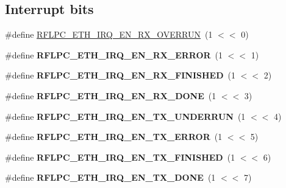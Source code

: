 \subsection*{Interrupt bits}
\begin{DoxyCompactItemize}
\item 
\#define \hyperlink{group__eth_ga0470a2297e3d90c742bea3417541d737}{R\-F\-L\-P\-C\-\_\-\-E\-T\-H\-\_\-\-I\-R\-Q\-\_\-\-E\-N\-\_\-\-R\-X\-\_\-\-O\-V\-E\-R\-R\-U\-N}~(1 $<$$<$ 0)
\item 
\hypertarget{group__eth_ga6329f5555827f898aaf654485a9f3be3}{\#define {\bfseries R\-F\-L\-P\-C\-\_\-\-E\-T\-H\-\_\-\-I\-R\-Q\-\_\-\-E\-N\-\_\-\-R\-X\-\_\-\-E\-R\-R\-O\-R}~(1 $<$$<$ 1)}\label{group__eth_ga6329f5555827f898aaf654485a9f3be3}

\item 
\hypertarget{group__eth_ga85bc0906a286f028975162407b00564f}{\#define {\bfseries R\-F\-L\-P\-C\-\_\-\-E\-T\-H\-\_\-\-I\-R\-Q\-\_\-\-E\-N\-\_\-\-R\-X\-\_\-\-F\-I\-N\-I\-S\-H\-E\-D}~(1 $<$$<$ 2)}\label{group__eth_ga85bc0906a286f028975162407b00564f}

\item 
\hypertarget{group__eth_gaba98ac40cdc532abcef7c120eca14d91}{\#define {\bfseries R\-F\-L\-P\-C\-\_\-\-E\-T\-H\-\_\-\-I\-R\-Q\-\_\-\-E\-N\-\_\-\-R\-X\-\_\-\-D\-O\-N\-E}~(1 $<$$<$ 3)}\label{group__eth_gaba98ac40cdc532abcef7c120eca14d91}

\item 
\hypertarget{group__eth_gab4d04836a465bcfaf614de6e069237dd}{\#define {\bfseries R\-F\-L\-P\-C\-\_\-\-E\-T\-H\-\_\-\-I\-R\-Q\-\_\-\-E\-N\-\_\-\-T\-X\-\_\-\-U\-N\-D\-E\-R\-R\-U\-N}~(1 $<$$<$ 4)}\label{group__eth_gab4d04836a465bcfaf614de6e069237dd}

\item 
\hypertarget{group__eth_ga2d05e34a39b0d75ad049e5d1fac395d6}{\#define {\bfseries R\-F\-L\-P\-C\-\_\-\-E\-T\-H\-\_\-\-I\-R\-Q\-\_\-\-E\-N\-\_\-\-T\-X\-\_\-\-E\-R\-R\-O\-R}~(1 $<$$<$ 5)}\label{group__eth_ga2d05e34a39b0d75ad049e5d1fac395d6}

\item 
\hypertarget{group__eth_ga8085ea43564e1ca5bf301bdbb063ff48}{\#define {\bfseries R\-F\-L\-P\-C\-\_\-\-E\-T\-H\-\_\-\-I\-R\-Q\-\_\-\-E\-N\-\_\-\-T\-X\-\_\-\-F\-I\-N\-I\-S\-H\-E\-D}~(1 $<$$<$ 6)}\label{group__eth_ga8085ea43564e1ca5bf301bdbb063ff48}

\item 
\hypertarget{group__eth_gad98d37754b45f06261b90341e5bf93a8}{\#define {\bfseries R\-F\-L\-P\-C\-\_\-\-E\-T\-H\-\_\-\-I\-R\-Q\-\_\-\-E\-N\-\_\-\-T\-X\-\_\-\-D\-O\-N\-E}~(1 $<$$<$ 7)}\label{group__eth_gad98d37754b45f06261b90341e5bf93a8}


\end{DoxyCompactItemize}
